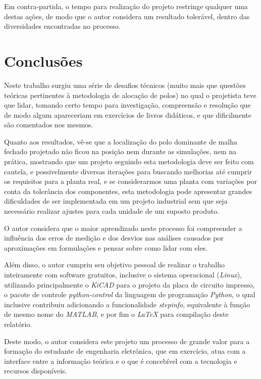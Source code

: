 \documentclass[
	12pt,				%
	article,			%
	openright,			%
	oneside,
	a4paper,			%
	chapter=TITLE,		%
	section=TITLE,		%
	english,			%
	french,				%
	spanish,			%
	brazil,				%
]{abntex2}
\begin{document}
                Em contra-partida, o tempo para realização do projeto restringe qualquer uma destas ações, de modo que o autor considera um resultado tolerável, dentro das diversidades encontradas no processo.

    \section{Conclusões}
    
        Neste trabalho surgiu uma série de desafios técnicos (muito mais que questões teóricas pertinentes à metodologia de alocação de polos) no qual o projetista teve que lidar, tomando certo tempo para investigação, compreensão e resolução que de modo algum apareceriam em exercícios de livros didáticos, e que dificilmente são comentados nos mesmos.
        
        Quanto aos resultados, vê-se que a localização do polo dominante de malha fechado projetado não ficou na posição nem durante as simulações, nem na prática, mostrando que um projeto seguindo esta metodologia deve ser feito com cautela, e possivelmente diversas iterações para buscando melhorias até cumprir os requisitos para a planta real, e se considerarmos uma planta com variações por conta da tolerância dos componentes, esta metodologia pode apresentar grandes dificuldades de ser implementada em um projeto industrial sem que seja necessário realizar ajustes para cada unidade de um suposto produto.
    
        O autor considera que o maior aprendizado neste processo foi compreender a influência dos erros de medição e dos desvios nas análises causados por aproximações em formulações e pensar sobre como lidar com eles. 
        
        Além disso, o autor cumpriu seu objetivo pessoal de realizar o trabalho inteiramente com software gratuitos, inclusive o sistema operacional (\textit{Linux}), utilizando principalmente o \textit{KiCAD} para o projeto da placa de circuito impresso, o pacote de controle \textit{python-control} da linguagem de programação \textit{Python}, o qual inclusive contribuiu adicionando a funcionalidade \textit{stepinfo}, equivalente à função de mesmo nome do \textit{MATLAB}, e por fim o \textit{LaTeX} para compilação deste relatório.
     
        Deste modo, o autor considera este projeto um processo de grande valor para a formação do estudante de engenharia eletrônica, que em exercício, atua com a interface entre a informação teórica e o que é concebível com a tecnologia e recursos disponíveis.
    
\end{document}
